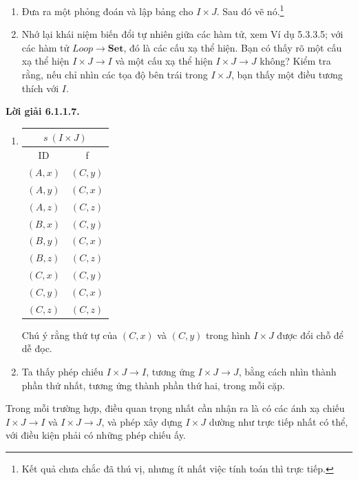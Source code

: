\begin{enumerate}[label=\alph*.]
\item Đưa ra một phỏng đoán và lập bảng cho $I\times J$. Sau đó vẽ nó.\footnote{Kết quả chưa chắc đã thú vị, nhưng ít nhất việc tính toán thì trực tiếp.}
\item Nhớ lại khái niệm biến đổi tự nhiên giữa các hàm tử, xem Ví dụ 5.3.3.5; với các hàm tử $\mathit{Loop}\to\mathbf{Set}$, đó là các cấu xạ thể hiện. Bạn có thấy rõ một cấu xạ thể hiện $I\times J\to I$ và một cấu xạ thể hiện $I\times J\to J$ không? Kiểm tra rằng, nếu chỉ nhìn các tọa độ bên trái trong $I\times J$, bạn thấy một điều tương thích với $I$.
\end{enumerate}
\noindent\textbf{Lời giải 6.1.1.7.}\keepwithnext
\begin{enumerate}[label=\alph*.]
\item
\begin{center}\begin{tabular}{cc}\multicolumn{2}{c}{$s\ (I\times J)$}\\\toprule ID&f\\\midrule
$(A,x)$&$(C,y)$\\$(A,y)$&$(C,x)$\\$(A,z)$&$(C,z)$\\$(B,x)$&$(C,y)$\\$(B,y)$&$(C,x)$\\$(B,z)$&$(C,z)$\\$(C,x)$&$(C,y)$\\$(C,y)$&$(C,x)$\\$(C,z)$&$(C,z)$\\\bottomrule\end{tabular}
\end{center}
\begin{center}\end{center}
Chú ý rằng thứ tự của $(C,x)$ và $(C,y)$ trong hình $I\times J$ được đổi chỗ để dễ đọc.
\item Ta thấy phép chiếu $I\times J\to I$, tương ứng $I\times J\to J$, bằng cách nhìn thành phần thứ nhất, tương ứng thành phần thứ hai, trong mỗi cặp.
\end{enumerate}
Trong mỗi trường hợp, điều quan trọng nhất cần nhận ra là có các ánh xạ chiếu $I\times J\to I$ và $I\times J\to J$, và phép xây dựng $I\times J$ dường như trực tiếp nhất có thể, với điều kiện phải có những phép chiếu ấy.

